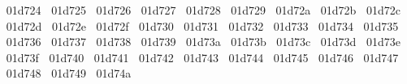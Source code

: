 {  ^^^^^^01d724%
  ^^^^^^01d725%
  ^^^^^^01d726%
  ^^^^^^01d727%
  ^^^^^^01d728%
  ^^^^^^01d729%
  ^^^^^^01d72a%
  ^^^^^^01d72b%
  ^^^^^^01d72c%
  ^^^^^^01d72d%
  ^^^^^^01d72e%
  ^^^^^^01d72f%
  ^^^^^^01d730%
  ^^^^^^01d731%
  ^^^^^^01d732%
  ^^^^^^01d733%
  ^^^^^^01d734%
  ^^^^^^01d735%
  ^^^^^^01d736%
  ^^^^^^01d737%
  ^^^^^^01d738%
  ^^^^^^01d739%
  ^^^^^^01d73a%
  ^^^^^^01d73b%
  ^^^^^^01d73c%
  ^^^^^^01d73d%
  ^^^^^^01d73e%
  ^^^^^^01d73f%
  ^^^^^^01d740%
  ^^^^^^01d741%
  ^^^^^^01d742%
  ^^^^^^01d743%
  ^^^^^^01d744%
  ^^^^^^01d745%
  ^^^^^^01d746%
  ^^^^^^01d747%
  ^^^^^^01d748%
  ^^^^^^01d749%
  ^^^^^^01d74a%
}
